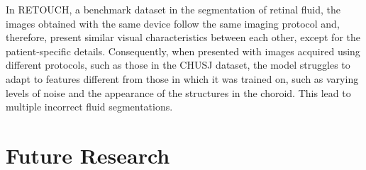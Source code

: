 \par
In RETOUCH, a benchmark dataset in the segmentation of retinal fluid, the images obtained with the same device follow the same imaging protocol and, therefore, present similar visual characteristics between each other, except for the patient-specific  details. Consequently, when presented with images acquired using different protocols, such as those in the CHUSJ dataset, the model struggles to adapt to features different from those in which it was trained on, such as varying levels of noise and the appearance of the structures in the choroid. This lead to multiple incorrect fluid segmentations.

\section{Future Research}

